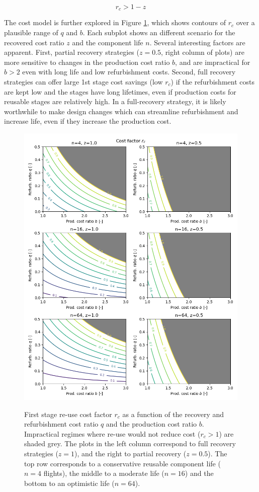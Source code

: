 \documentclass[conf]{new-aiaa}
\begin{document}
\begin{equation}
\label{eq:r_c_low_limit}
r_c > 1 - z
\end{equation}

The cost model is further explored in Figure \ref{fig:cost_model}, which shows contours of $r_c$ over a plausible range of $q$ and $b$. Each subplot shows an different scenario for the recovered cost ratio $z$ and the component life $n$. Several interesting factors are apparent. First, partial recovery strategies ($z=0.5$, right column of plots) are more sensitive to changes in the production cost ratio $b$, and are impractical for $b>2$ even with long life and low refurbishment costs. Second, full recovery strategies can offer large 1st stage cost savings (low $r_c$) if the refurbishment costs are kept low and the stages have long lifetimes, even if production costs for reusable stages are relatively high. In a full-recovery strategy, it is likely worthwhile to make design changes which can streamline refurbishment and increase life, even if they increase the production cost.

\begin{figure}[hbt!]
	\centering
	\includegraphics[width=1\textwidth]{../cost_model}
	\label{fig:cost_model}
	\caption{First stage re-use cost factor $r_c$ as a function of the recovery and refurbishment cost ratio $q$ and the production cost ratio $b$. Impractical regimes where re-use would not reduce cost ($r_c>1$) are shaded grey. The plots in the left column correspond to full recovery strategies ($z=1$), and the right to partial recovery ($z=0.5$). The top row corresponds to a conservative reusable component life ($n=4$ flights), the middle to a moderate life ($n=16$) and the bottom to an optimistic life ($n=64$).}
\end{figure}
\end{document}
